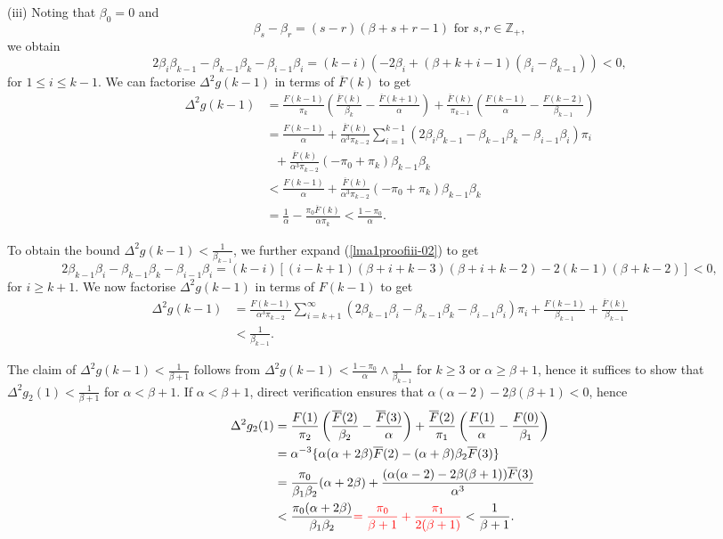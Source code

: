 \documentclass[12pt]{article}
\newcommand{\Z}{\mathbb{Z}}
\def\Ref#1{(\ref{#1})}
\newcommand{\oF}{{\overline{F}}}
\numberwithin{equation}{section}
\begin{document}
(iii) Noting that $\beta_0=0$ and 
\begin{equation}\beta_s-\beta_r=(s-r)(\beta+s+r-1)\mbox{ for }s,r\in\Z_+,\label{lma1proofiii-01}
\end{equation} we obtain
\begin{equation}2\beta_i\beta_{k-1}-\beta_{k-1}\beta_k-\beta_{i-1}\beta_i=(k-i)(-2\beta_i+(\beta+k+i-1)(\beta_i-\beta_{k-1}))<0,
\label{lma1proofiii-02}
\end{equation}
for $1\le i\le k-1$.  We can factorise $\Delta^2 g(k-1)$ in terms of $\oF(k)$ to get
\begin{align*}
\Delta^2 g(k-1)&=\frac{F(k-1)}{\pi_k}\left(\frac{\oF(k)}{\beta_k}-\frac{\oF(k+1)}{\alpha}\right)
+\frac{\oF(k)}{\pi_{k-1}}\left(\frac{F(k-1)}{\alpha}-\frac{F(k-2)}{\beta_{k-1}}\right)\nonumber\\
&=\frac{F(k-1)}{\alpha}+\frac{\oF(k)}{\alpha^3\pi_{k-2}}\sum_{i=1}^{k-1}(2\beta_i\beta_{k-1}-\beta_{k-1}\beta_k-\beta_{i-1}\beta_i)\pi_i\nonumber\\
&\ \ \ +\frac{\oF(k)}{\alpha^3\pi_{k-2}}\left(-\pi_0+\pi_k\right)\beta_{k-1}\beta_k\\
&<\frac{F(k-1)}{\alpha}+\frac{\oF(k)}{\alpha^3\pi_{k-2}}\left(-\pi_0+\pi_k\right)\beta_{k-1}\beta_k\\
&=\frac1\alpha-\frac{\pi_0\oF(k)}{\alpha\pi_k}
<\frac{1-\pi_0}\alpha.\end{align*}

To obtain the bound $\Delta^2 g(k-1)<\frac1{\beta_{k-1}}$, we further expand
 \Ref{lma1proofiii-02} to get
$$2\beta_{k-1}\beta_i-\beta_{k-1}\beta_k-\beta_{i-1}\beta_i
=(k-i)[(i-k+1)(\beta+i+k-3)(\beta+i+k-2)-2(k-1)(\beta+k-2)]<0,$$
for $i\ge k+1$. 
We now factorise $\Delta^2 g(k-1)$ in terms of $F(k-1)$ to get
 \begin{align*}
\Delta^2 g(k-1)&=\frac{F(k-1)}{\alpha^3\pi_{k-2}}\sum_{i=k+1}^\infty(2\beta_{k-1}\beta_i-\beta_{k-1}\beta_k-\beta_{i-1}\beta_i)\pi_i+\frac{F(k-1)}{\beta_{k-1}}+\frac{\oF(k)}{\beta_{k-1}}\\
&<\frac{1}{\beta_{k-1}}.
\end{align*}

The claim of $\Delta^2 g(k-1)<\frac1{\beta+1}$ follows from $\Delta^2 g(k-1)<\frac{1-\pi_0}\alpha\wedge\frac1{\beta_{k-1}}$ for $k\ge 3$ or $\alpha\ge \beta+1$, hence it suffices to show that $\Delta^2 g_2(1)<\frac1{\beta+1}$ for $\alpha< \beta+1$. If $\alpha<\beta+1$, direct verification ensures that $\alpha(\alpha-2)-2\beta(\beta+1)<0$, hence
\begin{align*}
\Delta^2 g_2(1)&=\frac{F(1)}{\pi_2}\left(\frac{\oF(2)}{\beta_2}-\frac{\oF(3)}{\alpha}\right)
+\frac{\oF(2)}{\pi_{1}}\left(\frac{F(1)}{\alpha}-\frac{F(0)}{\beta_{1}}\right)\nonumber\\
&=\alpha^{-3}\{\alpha(\alpha+2\beta)\oF(2)-(\alpha+\beta)\beta_2\oF(3)\}\nonumber\\
&=\frac{\pi_0}{\beta_1\beta_2}(\alpha+2\beta)+\frac{(\alpha(\alpha-2)-2\beta(\beta+1))\oF(3)}{\alpha^3}\\
&<\frac{\pi_0(\alpha+2\beta)}{\beta_1\beta_2}\textcolor{red}{=\frac{\pi_0}{\beta+1}+\frac{\pi_1}{2(\beta+1)}}<\frac1{\beta+1}.\end{align*}
\end{document}
